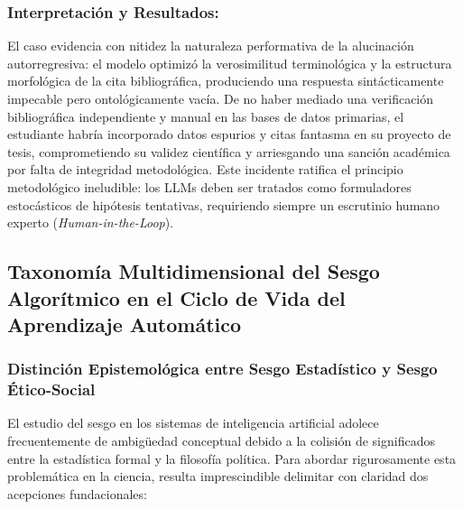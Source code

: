 \subsubsection*{Interpretación y Resultados:}
El caso evidencia con nitidez la naturaleza performativa de la alucinación autorregresiva: el modelo optimizó la verosimilitud terminológica y la estructura morfológica de la cita bibliográfica, produciendo una respuesta sintácticamente impecable pero ontológicamente vacía. De no haber mediado una verificación bibliográfica independiente y manual en las bases de datos primarias, el estudiante habría incorporado datos espurios y citas fantasma en su proyecto de tesis, comprometiendo su validez científica y arriesgando una sanción académica por falta de integridad metodológica. Este incidente ratifica el principio metodológico ineludible: los LLMs deben ser tratados como formuladores estocásticos de hipótesis tentativas, requiriendo siempre un escrutinio humano experto (\textit{Human-in-the-Loop}).


\subsection{Taxonomía Multidimensional del Sesgo Algorítmico en el Ciclo de Vida del Aprendizaje Automático}


\vspace{0.4cm}

\subsubsection{Distinción Epistemológica entre Sesgo Estadístico y Sesgo Ético-Social}

El estudio del sesgo en los sistemas de inteligencia artificial adolece frecuentemente de ambigüedad conceptual debido a la colisión de significados entre la estadística formal y la filosofía política. Para abordar rigurosamente esta problemática en la ciencia, resulta imprescindible delimitar con claridad dos acepciones fundacionales:

